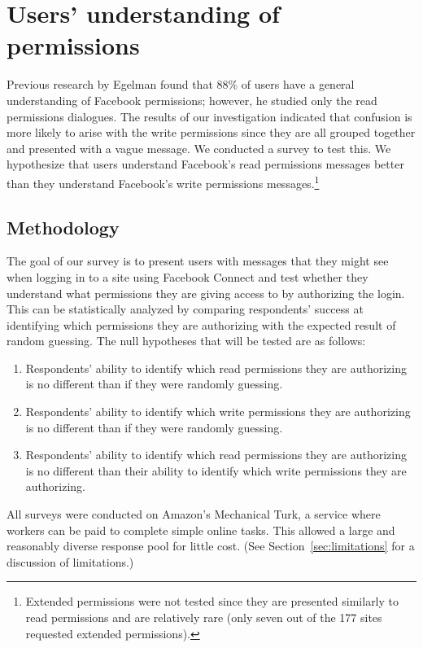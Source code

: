\documentclass[10pt]{sig-alternate-10pt}
\begin{document}
\section{Users' understanding of permissions}
\label{sec:understanding}

Previous research  by Egelman \cite{egelman} found that 88\% of users have a general understanding of Facebook permissions; however, he studied only the read permissions dialogues. The results of our investigation indicated that confusion is more likely to arise with the write permissions since they are all grouped together and presented with a vague message. We conducted a survey to test this. We hypothesize that users understand Facebook's read permissions messages better than they understand Facebook's write permissions messages.\footnote{Extended permissions were not tested since they are presented similarly to read permissions and are relatively rare (only seven out of the 177 sites requested extended permissions).}

\subsection{Methodology}

The goal of our survey is to present users with messages that they might see when logging in to a site using Facebook Connect and test whether they understand what permissions they are giving access to by authorizing the login. This can be statistically analyzed by comparing respondents' success at identifying which permissions they are authorizing with the expected result of random guessing. The null hypotheses that will be tested are as follows:

\begin{enumerate}
  \item Respondents' ability to identify which read permissions they are authorizing is no different than if they were randomly guessing.
  \item Respondents' ability to identify which write permissions they are authorizing is no different than if they were randomly guessing.
  \item Respondents' ability to identify which read permissions they are authorizing is no different than their ability to identify which write permissions they are authorizing.
\end{enumerate}

All surveys were conducted on Amazon's Mechanical Turk, a service where workers can be paid to complete simple online tasks. This allowed a large and reasonably diverse response pool for little cost. (See Section~\ref{sec:limitations} for a discussion of limitations.)
\end{document}
